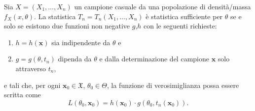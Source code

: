 \begin{thm} Sia \(X = (X_1,\dotsc,X_n)\) un campione casuale da una popolazione di densità/massa \(f_X(x,\theta)\).
La statistica \(T_n=T_n(X_1,\dotsc,X_n)\) è statistica sufficiente per \(\theta\) se e solo se esistono due funzioni non negative \(g\),\(h\) con le seguenti richieste:
\begin{enumerate}
\item \(h=h(\mathbf{x})\) sia indipendente da \(\theta{}\) e
\item \(g=g(\theta, t_n)\) dipenda da \(\theta\) e dalla determinazione del campione \(\mathbf{x}\) solo attraverso \(t_n\),
\end{enumerate}
e tali che, per ogni \(\mathbf{x}_0 \in \mathfrak{X}\), \(\theta_0 \in \Theta\),
la funzione di verosimiglianza possa essere scritta come
\begin{equation}
  L(\theta_0,\mathbf{x}_0)=h(\mathbf{x}_0)\cdot g(\theta_0, t_n(\mathbf{x}_0)).
\end{equation}
\end{thm}

